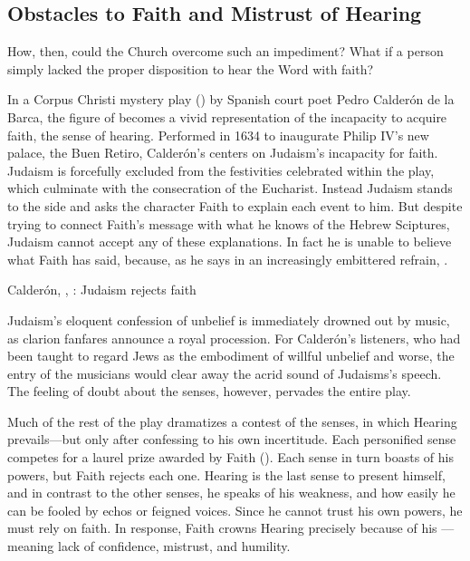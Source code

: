 \subsection{Obstacles to Faith and Mistrust of Hearing}

How, then, could the Church overcome such an impediment?
What if a person simply lacked the proper disposition to hear the Word with faith?

In a Corpus Christi mystery play () by Spanish court poet Pedro Calderón de la Barca, the figure of  becomes a vivid representation of the incapacity to acquire faith,  the sense of hearing.
Performed in 1634 to inaugurate Philip IV's new palace, the Buen Retiro, Calderón's  centers on Judaism's incapacity for faith.%
\autocite{Calderon:Retiro}
Judaism is forcefully excluded from the festivities celebrated within the play, which culminate with the consecration of the Eucharist.
Instead Judaism stands to the side and asks the character Faith to explain each event to him.
But despite trying to connect Faith's message with what he knows of the Hebrew Sciptures, Judaism cannot accept any of these explanations.
In fact he is unable to believe what Faith has said, because, as he says in an increasingly embittered refrain, .

\begin{expoem}
  \caption{Calderón, , : Judaism rejects faith}
  \label{expoem:Calderon-Retiro-Judaismo}
\end{expoem}

Judaism's eloquent confession of unbelief is immediately drowned out by music, as clarion fanfares announce a royal procession.
For Calderón's listeners, who had been taught to regard Jews as the embodiment of willful unbelief and worse, the entry of the musicians would clear away the acrid sound of Judaisms's speech.
The feeling of doubt about the senses, however, pervades the entire play.

Much of the rest of the play dramatizes a contest of the senses, in which Hearing prevails---but only after confessing to his own incertitude.
Each personified sense competes for a laurel prize awarded by Faith ().
Each sense in turn boasts of his powers, but Faith rejects each one.
Hearing is the last sense to present himself, and in contrast to the other senses, he speaks of his weakness, and how easily he can be fooled by echos or feigned voices.
Since he cannot trust his own powers, he must rely on faith.
In response, Faith crowns Hearing precisely because of his ---meaning lack of confidence, mistrust, and humility.

